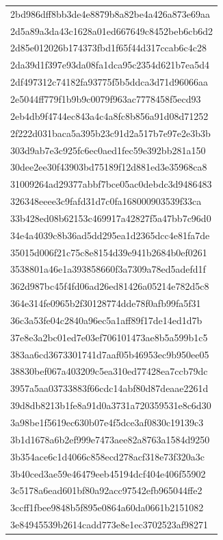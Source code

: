 \begin{tabular}{l}
2bd986dff8bb3de4e8879b8a82be4a426a873e69aa \\
2d5a89a3da43c1628a01ed667649c8452beb6cb6d2 \\
2d85e012026b174373fbd1f65f44d317ccab6c4c28 \\
2da39d1f397e93da08fa1dca95c2354d621b7ea5d4 \\
2df497312c74182fa93775f5b5ddca3d71d96066aa \\
2e5044ff779f1b9b9c0079f963ac7778458f5ecd93 \\
2eb4db9f4744ec843a4c4a8fc8b856a91d08d71252 \\
2f222d031baca5a395b23c91d2a517b7e97e2e3b3b \\
303d9ab7e3c925fc6ec0aed1fec59e392bb281a150 \\
30dee2ee30f43903bd75189f12d881ed3e35968ca8 \\
31009264ad29377abbf7bce05ac0debdc3d9486483 \\
326348eeee3c9fafd31d7c0fa168000903539f33ca \\
33b428ed08b62153c469917a42827f5a47bb7c96d0 \\
34e4a4039c8b36ad5dd295ea1d2365dcc4e81fa7de \\
35015d006f21c75c8e8154d39e941b2684b0ef0261 \\
3538801a46e1a393858660f3a7309a78ed5adefd1f \\
362d987bc45f4fd06ad26ed81426a05214e782d5c8 \\
364e314fe0965b2f30128774dde78f0afb99fa5f31 \\
36c3a53fe04c2840a96ec5a1aff89f17de14ed1d7b \\
37e8e3a2bc01ed7e03ef706101473ae8b5a599b1c5 \\
383aa6cd3673301741d7aaf05b46953ec9b950ee05 \\
38830bef067a403209c5ea310ed77428ea7ccb79dc \\
3957a5aa03733883f66cdc14abf80d87deaae2261d \\
39d8db8213b1fe8a91d0a3731a720359531e8c6d30 \\
3a98be1f5619ec630b07e4f5dce3af0830c19139c3 \\
3b1d1678a6b2ef999e7473aee82a8763a1584d9250 \\
3b354ace6c1d4066c858ecd278acf318e73f320a3c \\
3b40ced3ae59e46479eeb45194dcf404e406f55902 \\
3c5178a6ead601bf80a92acc97542efb965044ffe2 \\
3ccff1fbee9848b5f895e0864a60da0661b2151082 \\
3e84945539b2614cadd773e8e1ec3702523af98271 \\

\end{tabular}
